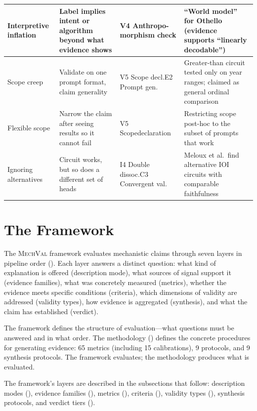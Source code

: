 \documentclass{article}
\newcommand{\mechval}{\textsc{MechVal}}
\begin{document}
\begin{table}[H]
\begin{tabular}{@{}l>{\raggedright\arraybackslash}p{3.2cm}>{\raggedright\arraybackslash}p{2.8cm}>{\raggedright\arraybackslash}p{4.0cm}@{}}
\midrule
Interpretive inflation & Label implies intent or algorithm beyond what evidence shows & V4 Anthropo-\newline morphism check & ``World model'' for Othello (evidence supports ``linearly decodable'') \\
\midrule
Scope creep & Validate on one prompt format, claim generality & V5 Scope decl.\newline E2 Prompt gen. & Greater-than circuit tested only on year ranges; claimed as general ordinal comparison \\
\midrule
Flexible scope & Narrow the claim after seeing results so it cannot fail & V5 Scope\newline declaration & Restricting scope post-hoc to the subset of prompts that work \\
\midrule
Ignoring alternatives & Circuit works, but so does a different set of heads & I4 Double dissoc.\newline C3 Convergent val. & Meloux et al.\ find alternative IOI circuits with comparable faithfulness \\
\bottomrule
\end{tabular}
\end{table}
\endgroup


\section{The Framework}
\label{sec:framework}

The \mechval{} framework evaluates mechanistic claims through seven layers in pipeline order (). Each layer answers a distinct question: what kind of explanation is offered (description mode), what sources of signal support it (evidence families), what was concretely measured (metrics), whether the evidence meets specific conditions (criteria), which dimensions of validity are addressed (validity types), how evidence is aggregated (synthesis), and what the claim has established (verdict). 

The framework defines the structure of evaluation---what questions must be answered and in what order. The methodology () defines the concrete procedures for generating evidence: 65 metrics (including 15 calibrations), 9 protocols, and 9 synthesis protocols. The framework evaluates; the methodology produces what is evaluated.

The framework's layers are described in the subsections that follow: description modes (), evidence families (), metrics (), criteria (), validity types (), synthesis protocols, and verdict tiers ().
\end{document}
